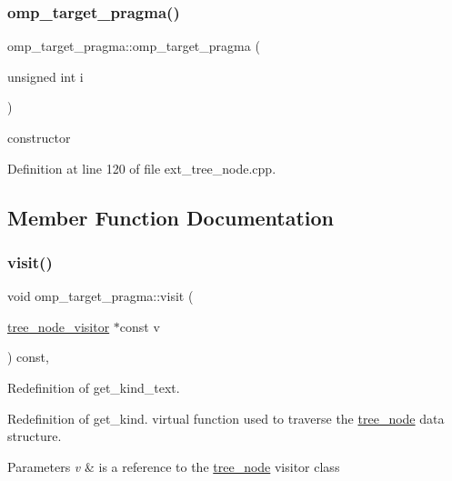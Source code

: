 \subsubsection{\texorpdfstring{omp\+\_\+target\+\_\+pragma()}{omp\_target\_pragma()}}
{\footnotesize\ttfamily omp\+\_\+target\+\_\+pragma\+::omp\+\_\+target\+\_\+pragma (\begin{DoxyParamCaption}\item[{unsigned int}]{i }\end{DoxyParamCaption})\hspace{0.3cm}{\ttfamily [explicit]}}



constructor 



Definition at line 120 of file ext\+\_\+tree\+\_\+node.\+cpp.



\subsection{Member Function Documentation}
\mbox{\label{structomp__target__pragma_a6b68bf02eef68fa2c841b75afabf06b7}} 
\subsubsection{\texorpdfstring{visit()}{visit()}}
{\footnotesize\ttfamily void omp\+\_\+target\+\_\+pragma\+::visit (\begin{DoxyParamCaption}\item[{\hyperlink{classtree__node__visitor}{tree\+\_\+node\+\_\+visitor} $\ast$const}]{v }\end{DoxyParamCaption}) const\hspace{0.3cm}{\ttfamily [override]}, {\ttfamily [virtual]}}



Redefinition of get\+\_\+kind\+\_\+text. 

Redefinition of get\+\_\+kind. virtual function used to traverse the \hyperlink{classtree__node}{tree\+\_\+node} data structure. 
\begin{DoxyParams}{Parameters}
{\em v} & is a reference to the \hyperlink{classtree__node}{tree\+\_\+node} visitor class \\
\hline
\end{DoxyParams}


